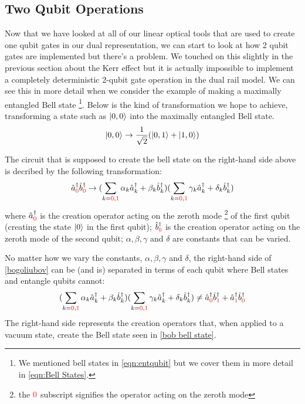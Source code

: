 



\subsection{Two Qubit Operations}
Now that we have looked at all of our linear optical tools that are used to create one qubit gates in our dual representation, we can start to look at how 2 qubit gates are implemented but there's a problem. We touched on this slightly in the previous section about the Kerr effect but it is actually impossible to implement a completely deterministic 2-qubit gate operation in the dual rail model\cite{PhysRevA.59.3295}\cite{PhysRevA.62.064301}. We can see this in more detail when we consider the example of making a maximally entangled Bell state \footnote{We mentioned bell states in  \cref{eqn:entqubit} but we cover them in more detail in \ref{eqn:Bell States}.}. Below is the kind of transformation we hope to achieve, transforming a state such as $\ket{0,0}$ into the maximally entangled Bell state.
\begin{equation} \label{bob bell state}
    \ket{0,0} \rightarrow \frac{1}{\sqrt{2}}(\ket{0,1} + \ket{1,0})
\end{equation}

The circuit that is supposed to create the bell state on the right-hand side above is decribed by the following transformation:
\begin{equation} \label{bogoliubov}
    \hat{a}^{\dag}_{\color{red}0}\hat{b}^{\dag}_{\color{red}0} \rightarrow (\sum\limits_{k={\color{red}0},{\color{red}1}}\alpha_k\hat{a}^{\dag}_k + \beta_k\hat{b}^{\dag}_k)(\sum\limits_{k={\color{red}0},{\color{red}1}}\gamma_k\hat{a}^{\dag}_k + \delta_k\hat{b}^{\dag}_k)
\end{equation} \cite{Kok:2005jip}
where $\hat{a}^\dag_{\color{red}0}$ is the creation operator acting on the zeroth mode \footnote{the ${\color{red}0}$ subscript signifies the operator acting on the zeroth mode} of the first qubit (creating the state $\ket{0}$ in the first qubit); $\hat{b}^\dag_{\color{red}0}$ is the creation operator acting on the zeroth mode of the second qubit; $\alpha, \beta, \gamma$ and $\delta$ are constants that can be varied.
\par
No matter how we vary the constants,  $\alpha, \beta, \gamma$ and $\delta$, the right-hand side of \cref{bogoliubov} can be (and is) separated in terms of each qubit where Bell states and entangle qubits cannot:
\begin{equation}
    (\sum\limits_{k={\color{red}0},{\color{red}1}}\alpha_k\hat{a}^{\dag}_k + \beta_k\hat{b}^{\dag}_k)(\sum\limits_{k={\color{red}0},{\color{red}1}}\gamma_k\hat{a}^{\dag}_k + \delta_k\hat{b}^{\dag}_k) \neq \hat{a}^{\dag}_{\color{red}0}\hat{b}^{\dag}_{\color{red}1} + \hat{a}^{\dag}_{\color{red}1}\hat{b}^{\dag}_{\color{red}0}
\end{equation}
The right-hand side represents the creation operators that, when applied to a vacuum state, create the Bell state seen in \cref{bob bell state}.

